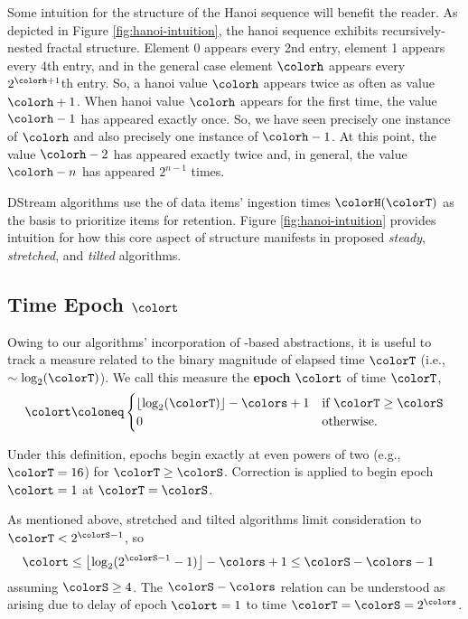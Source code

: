 Some intuition for the structure of the Hanoi sequence will benefit the reader.
As depicted in Figure \ref{fig:hanoi-intuition}, the hanoi sequence exhibits recursively-nested fractal structure.
Element 0 appears every 2nd entry, element 1 appears every 4th entry, and in the general case element $\colorh$ appears every $2^{\colorh+1}$th entry.
So, a hanoi value $\colorh$ appears twice as often as value $\colorh + 1$.
When hanoi value $\colorh$ appears for the first time, the value $\colorh - 1$ has appeared exactly once.
So, we have seen precisely one instance of $\colorh$ and also precisely one instance of $\colorh - 1$.
At this point, the value $\colorh - 2$ has appeared exactly twice and, in general, the value $\colorh - n$ has appeared $2^{n - 1}$ times.

DStream algorithms use the \hv{} of data items' ingestion times $\colorH(\colorT)$ as the basis to prioritize items for retention.
Figure \ref{fig:hanoi-intuition} provides intuition for how this core aspect of structure manifests in proposed \textit{steady}, \textit{stretched}, and \textit{tilted} algorithms.



\subsection{Time Epoch $\colort$}
\label{sec:notation-epoch}

Owing to our algorithms' incorporation of \hv{}-based abstractions, it is useful to track a measure related to the binary magnitude of elapsed time $\colorT$ (i.e., $\sim \log_2(\colorT)$).
We call this measure the \textbf{epoch} $\colort$ of time $\colorT$,
\begin{equation}
\colort
\coloneq
\begin{cases}
\left\lfloor \log_2(\colorT) \right\rfloor - \colors + 1 & \text{if $\colorT \geq \colorS$} \\
0 & \text{otherwise.}
\end{cases}
\label{eqn:epoch-defn}
\end{equation}

Under this definition, epochs begin exactly at even powers of two (e.g., $\colorT = 16$) for $\colorT \geq \colorS$.
Correction is applied to begin epoch $\colort=1$ at $\colorT = \colorS$.

As mentioned above, stretched and tilted algorithms limit consideration to $\colorT < 2^{\colorS - 1}$, so
\begin{align*}
\colort &\leq \left\lfloor\log_2(2^{\colorS - 1} - 1)\right\rfloor - \colors + 1
\leq \colorS - \colors - 1
\end{align*}
assuming $\colorS \geq 4$.
The $\colorS - \colors$ relation can be understood as arising due to delay of epoch $\colort=1$ to time $\colorT = \colorS = 2^{\colors}$.

